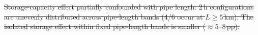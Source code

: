 \documentclass[a4paper,fleqn]{cas-sc} %
\providecommand{\DIFadd}[1]{{\protect\color{blue}\uwave{#1}}} %
\providecommand{\DIFdel}[1]{{\protect\color{red}\sout{#1}}} %
\providecommand{\DIFaddFL}[1]{\DIFadd{#1}} %
\providecommand{\DIFdelFL}[1]{\DIFdel{#1}} %
\providecommand{\DIFaddbeginFL}{} %
\providecommand{\DIFaddendFL}{} %
\providecommand{\DIFdelbeginFL}{} %
\providecommand{\DIFdelendFL}{} %
\begin{document}
{{%
\DIFdelFL{Storage-capacity effect partially confounded with
    pipe length: 2\,h configurations are unevenly distributed
    across pipe-length bands (4/6 occur at $L \geq 5$\,km).
    The isolated storage effect within fixed pipe-length bands
    is smaller (${\approx}5$}\DIFdelendFL \DIFaddbeginFL \DIFaddFL{$0.15$}\DIFaddendFL --\DIFdelbeginFL \DIFdelFL{$8$\,pp).
}%

}}
\end{document}
